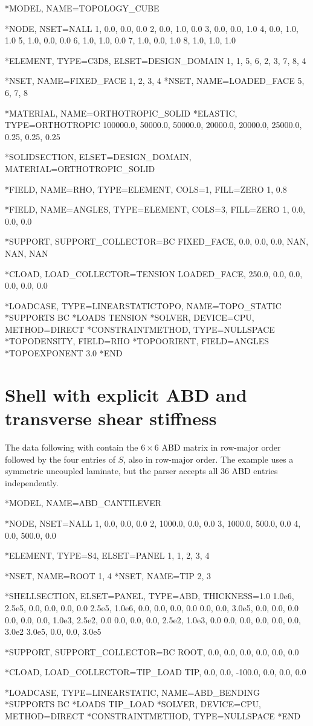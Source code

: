 \begin{exampledeck}
*MODEL, NAME=TOPOLOGY_CUBE

*NODE, NSET=NALL
1, 0.0, 0.0, 0.0
2, 0.0, 1.0, 0.0
3, 0.0, 0.0, 1.0
4, 0.0, 1.0, 1.0
5, 1.0, 0.0, 0.0
6, 1.0, 1.0, 0.0
7, 1.0, 0.0, 1.0
8, 1.0, 1.0, 1.0

*ELEMENT, TYPE=C3D8, ELSET=DESIGN_DOMAIN
1, 1, 5, 6, 2, 3, 7, 8, 4

*NSET, NAME=FIXED_FACE
1, 2, 3, 4
*NSET, NAME=LOADED_FACE
5, 6, 7, 8

*MATERIAL, NAME=ORTHOTROPIC_SOLID
*ELASTIC, TYPE=ORTHOTROPIC
100000.0, 50000.0, 50000.0, 20000.0, 20000.0, 25000.0, 0.25, 0.25, 0.25

*SOLIDSECTION, ELSET=DESIGN_DOMAIN, MATERIAL=ORTHOTROPIC_SOLID

*FIELD, NAME=RHO, TYPE=ELEMENT, COLS=1, FILL=ZERO
1, 0.8

*FIELD, NAME=ANGLES, TYPE=ELEMENT, COLS=3, FILL=ZERO
1, 0.0, 0.0, 0.0

*SUPPORT, SUPPORT_COLLECTOR=BC
FIXED_FACE, 0.0, 0.0, 0.0, NAN, NAN, NAN

*CLOAD, LOAD_COLLECTOR=TENSION
LOADED_FACE, 250.0, 0.0, 0.0, 0.0, 0.0, 0.0

*LOADCASE, TYPE=LINEARSTATICTOPO, NAME=TOPO_STATIC
*SUPPORTS
BC
*LOADS
TENSION
*SOLVER, DEVICE=CPU, METHOD=DIRECT
*CONSTRAINTMETHOD, TYPE=NULLSPACE
*TOPODENSITY, FIELD=RHO
*TOPOORIENT, FIELD=ANGLES
*TOPOEXPONENT
3.0
*END
\end{exampledeck}

\section{Shell with explicit ABD and transverse shear stiffness}

The data following  with  contain the \(6\times6\) ABD matrix in row-major order followed by the four entries of \(S\), also in row-major order. The example uses a symmetric uncoupled laminate, but the parser accepts all 36 ABD entries independently.

\begin{exampledeck}
*MODEL, NAME=ABD_CANTILEVER

*NODE, NSET=NALL
1,    0.0,   0.0, 0.0
2, 1000.0,   0.0, 0.0
3, 1000.0, 500.0, 0.0
4,    0.0, 500.0, 0.0

*ELEMENT, TYPE=S4, ELSET=PANEL
1, 1, 2, 3, 4

*NSET, NAME=ROOT
1, 4
*NSET, NAME=TIP
2, 3

*SHELLSECTION, ELSET=PANEL, TYPE=ABD, THICKNESS=1.0
1.0e6, 2.5e5, 0.0, 0.0, 0.0, 0.0
2.5e5, 1.0e6, 0.0, 0.0, 0.0, 0.0
0.0, 0.0, 3.0e5, 0.0, 0.0, 0.0
0.0, 0.0, 0.0, 1.0e3, 2.5e2, 0.0
0.0, 0.0, 0.0, 2.5e2, 1.0e3, 0.0
0.0, 0.0, 0.0, 0.0, 0.0, 3.0e2
3.0e5, 0.0, 0.0, 3.0e5

*SUPPORT, SUPPORT_COLLECTOR=BC
ROOT, 0.0, 0.0, 0.0, 0.0, 0.0, 0.0

*CLOAD, LOAD_COLLECTOR=TIP_LOAD
TIP, 0.0, 0.0, -100.0, 0.0, 0.0, 0.0

*LOADCASE, TYPE=LINEARSTATIC, NAME=ABD_BENDING
*SUPPORTS
BC
*LOADS
TIP_LOAD
*SOLVER, DEVICE=CPU, METHOD=DIRECT
*CONSTRAINTMETHOD, TYPE=NULLSPACE
*END
\end{exampledeck}

